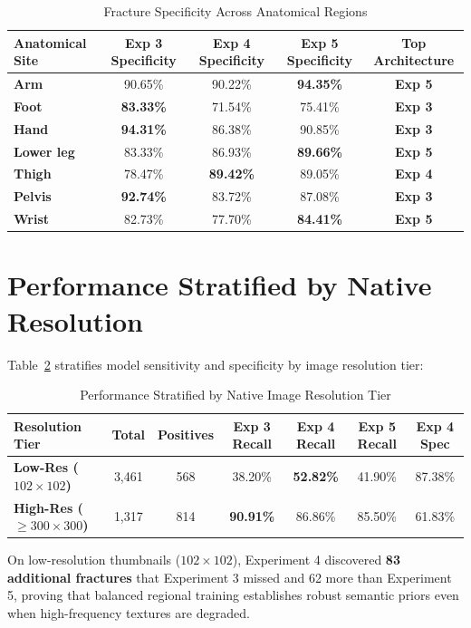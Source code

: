 \documentclass[12pt, a4paper]{report}
\begin{document}
\begin{table}[H]
\centering
\caption{Fracture Specificity Across Anatomical Regions}
\label{tab:region_spec}
\begin{tabular}{lcccc}
\toprule
\textbf{Anatomical Site} & \textbf{Exp 3 Specificity} & \textbf{Exp 4 Specificity} & \textbf{Exp 5 Specificity} & \textbf{Top Architecture} \\
\midrule
\textbf{Arm} & 90.65\% & 90.22\% & \textbf{94.35\%} & \textbf{Exp 5} \\
\textbf{Foot} & \textbf{83.33\%} & 71.54\% & 75.41\% & \textbf{Exp 3} \\
\textbf{Hand} & \textbf{94.31\%} & 86.38\% & 90.85\% & \textbf{Exp 3} \\
\textbf{Lower leg} & 83.33\% & 86.93\% & \textbf{89.66\%} & \textbf{Exp 5} \\
\textbf{Thigh} & 78.47\% & \textbf{89.42\%} & 89.05\% & \textbf{Exp 4} \\
\textbf{Pelvis} & \textbf{92.74\%} & 83.72\% & 87.08\% & \textbf{Exp 3} \\
\textbf{Wrist} & 82.73\% & 77.70\% & \textbf{84.41\%} & \textbf{Exp 5} \\
\bottomrule
\end{tabular}
\end{table}

\section{Performance Stratified by Native Resolution}
Table~\ref{tab:resolution_stratified} stratifies model sensitivity and specificity by image resolution tier:
\begin{table}[H]
\centering
\caption{Performance Stratified by Native Image Resolution Tier}
\label{tab:resolution_stratified}
\begin{tabularx}{\textwidth}{lcccccc}
\toprule
\textbf{Resolution Tier} & \textbf{Total} & \textbf{Positives} & \textbf{Exp 3 Recall} & \textbf{Exp 4 Recall} & \textbf{Exp 5 Recall} & \textbf{Exp 4 Spec} \\
\midrule
\textbf{Low-Res ($102\times 102$)} & 3,461 & 568 & 38.20\% & \textbf{52.82\%} & 41.90\% & 87.38\% \\
\textbf{High-Res ($\ge 300\times 300$)} & 1,317 & 814 & \textbf{90.91\%} & 86.86\% & 85.50\% & 61.83\% \\
\bottomrule
\end{tabularx}
\end{table}
On low-resolution thumbnails ($102\times 102$), Experiment 4 discovered \textbf{83 additional fractures} that Experiment 3 missed and 62 more than Experiment 5, proving that balanced regional training establishes robust semantic priors even when high-frequency textures are degraded.
\end{document}
